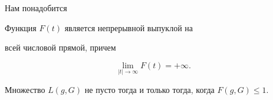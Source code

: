  


Нам понадобится 


 


\begin{lemnonum} Функция $F(t)$ является непрерывной выпуклой на 


всей числовой прямой, причем 


\begin{equation} 


\lim_{|t|\to\infty}F(t)=+\infty. 


\end{equation} 


 


Множество $L(g,G)$ не пусто тогда и только тогда, когда $F(g,G)\le 1$. 


\end{lemnonum} 


 


